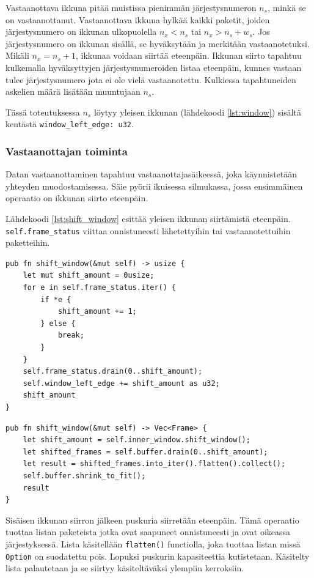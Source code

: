 \documentclass[a4paper,12pt]{article}
\begin{document}
    Vastaanottava ikkuna pitää muistissa pienimmän järjestysnumeron $n_s$, minkä se on vastaanottanut.
    Vastaanottava ikkuna hylkää kaikki paketit, joiden järjestysnumero on ikkunan ulkopuolella $n_x < n_s$ tai $n_x > n_s + w_s$. Jos järjestysnumero on ikkunan sisällä, se hyväksytään ja merkitään vastaanotetuksi. Mikäli $n_x = n_s + 1$, ikkunaa voidaan siirtää eteenpäin.
    Ikkunan siirto tapahtuu kulkemalla hyväksyttyjen järjestysnumeroiden listaa eteenpäin, kunnes vastaan tulee järjestysnumero jota ei ole vielä vastaanotettu. Kulkiessa tapahtuneiden askelien määrä lisätään muuntujaan $n_s$.

    Tässä toteutuksessa $n_s$ löytyy yleisen ikkunan (lähdekoodi \ref{lst:window}) sisältä kentästä \lstinline{window_left_edge: u32}.


    \subsubsection{Vastaanottajan toiminta}
    Datan vastaanottaminen tapahtuu vastaanottajasäikeessä, joka käynnistetään yhteyden muodostamisessa.
    Säie pyörii ikuisessa silmukassa, jossa ensimmäinen operaatio on ikkunan siirto eteenpäin.

    Lähdekoodi \ref{lst:shift_window} esittää yleisen ikkunan siirtämistä eteenpäin.
    \lstinline{self.frame_status} viittaa onnistuneesti lähetettyihin tai vastaanotettuihin paketteihin.

    \begin{lstlisting}[caption={Ikkunan siirto}, label={lst:shift_window}]
pub fn shift_window(&mut self) -> usize {
    let mut shift_amount = 0usize;
    for e in self.frame_status.iter() {
        if *e {
            shift_amount += 1;
        } else {
            break;
        }
    }
    self.frame_status.drain(0..shift_amount);
    self.window_left_edge += shift_amount as u32;
    shift_amount
}\end{lstlisting}


    \begin{lstlisting}[caption={Vastaanottajan ikkunan siirto}, label={lst:shift_rwindow}]
pub fn shift_window(&mut self) -> Vec<Frame> {
    let shift_amount = self.inner_window.shift_window();
    let shifted_frames = self.buffer.drain(0..shift_amount);
    let result = shifted_frames.into_iter().flatten().collect();
    self.buffer.shrink_to_fit();
    result
}\end{lstlisting}

    Sisäisen ikkunan siirron jälkeen puskuria siirretään eteenpäin. Tämä operaatio tuottaa
    listan paketeista jotka ovat saapuneet onnistuneesti ja ovat oikeassa järjestyksessä.
    Lista käsitellään \lstinline{flatten()} functiolla, joka tuottaa listan missä \lstinline{Option}
    on suodatettu pois. Lopuksi puskurin kapasiteettia kutistetaan. Käsitelty lista palautetaan ja se siirtyy käsiteltäväksi ylempiin kerroksiin. \par
\end{document}
